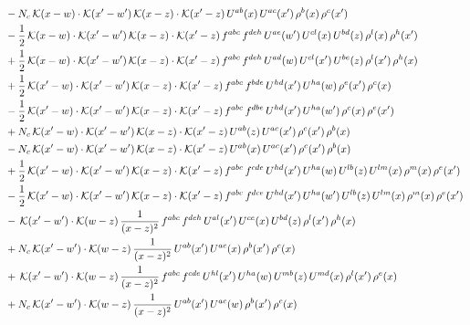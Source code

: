 \documentclass[9pt]{article}
\numberwithin{equation}{section}
\begin{document}
\begin{align}
&-N_{c}\,\mathcal{K}(x-w)\cdot\mathcal{K}(x'-w')\,\mathcal{K}(x-z)\cdot\mathcal{K}(x'-z)\,U^{ab}(x)\,U^{ac}(x')\,\rho^{b}(x)\,\rho^{c}(x')\notag \\ 
&-\frac{1}{2}\,\mathcal{K}(x-w)\cdot\mathcal{K}(x'-w')\,\mathcal{K}(x-z)\cdot\mathcal{K}(x'-z)\,f^{abc}\,f^{deh}\,U^{ae}(w')\,U^{cl}(x)\,U^{bd}(z)\,\rho^{l}(x)\,\rho^{h}(x')\notag \\ 
&+\frac{1}{2}\,\mathcal{K}(x-w)\cdot\mathcal{K}(x'-w')\,\mathcal{K}(x-z)\cdot\mathcal{K}(x'-z)\,f^{abc}\,f^{deh}\,U^{ad}(w)\,U^{cl}(x')\,U^{be}(z)\,\rho^{l}(x')\,\rho^{h}(x)\notag \\ 
&+\frac{1}{2}\,\mathcal{K}(x'-w)\cdot\mathcal{K}(x'-w')\,\mathcal{K}(x-z)\cdot\mathcal{K}(x'-z)\,f^{abc}\,f^{bde}\,U^{hd}(x')\,U^{ha}(w)\,\rho^{e}(x')\,\rho^{c}(x)\notag \\ 
&-\frac{1}{2}\,\mathcal{K}(x'-w)\cdot\mathcal{K}(x'-w')\,\mathcal{K}(x-z)\cdot\mathcal{K}(x'-z)\,f^{abc}\,f^{dbe}\,U^{hd}(x')\,U^{ha}(w')\,\rho^{c}(x)\,\rho^{e}(x')\notag \\ 
&+N_{c}\,\mathcal{K}(x'-w)\cdot\mathcal{K}(x'-w')\,\mathcal{K}(x-z)\cdot\mathcal{K}(x'-z)\,U^{ab}(z)\,U^{ac}(x')\,\rho^{c}(x')\,\rho^{b}(x)\notag \\ 
&-N_{c}\,\mathcal{K}(x'-w)\cdot\mathcal{K}(x'-w')\,\mathcal{K}(x-z)\cdot\mathcal{K}(x'-z)\,U^{ab}(x)\,U^{ac}(x')\,\rho^{c}(x')\,\rho^{b}(x)\notag \\ 
&+\frac{1}{2}\,\mathcal{K}(x'-w)\cdot\mathcal{K}(x'-w')\,\mathcal{K}(x-z)\cdot\mathcal{K}(x'-z)\,f^{abc}\,f^{cde}\,U^{hd}(x')\,U^{ha}(w)\,U^{lb}(z)\,U^{lm}(x)\,\rho^{m}(x)\,\rho^{e}(x')\notag \\ 
&-\frac{1}{2}\,\mathcal{K}(x'-w)\cdot\mathcal{K}(x'-w')\,\mathcal{K}(x-z)\cdot\mathcal{K}(x'-z)\,f^{abc}\,f^{dce}\,U^{hd}(x')\,U^{ha}(w')\,U^{lb}(z)\,U^{lm}(x)\,\rho^{m}(x)\,\rho^{e}(x')\notag \\ 
&-\,\mathcal{K}(x'-w')\cdot\mathcal{K}(w-z)\,\frac{1}{(x-z)^{2}}\,f^{abc}\,f^{deh}\,U^{al}(x')\,U^{ce}(x)\,U^{bd}(z)\,\rho^{l}(x')\,\rho^{h}(x)\notag \\ 
&+N_{c}\,\mathcal{K}(x'-w')\cdot\mathcal{K}(w-z)\,\frac{1}{(x-z)^{2}}\,U^{ab}(x')\,U^{ac}(x)\,\rho^{b}(x')\,\rho^{c}(x)\notag \\ 
&+\,\mathcal{K}(x'-w')\cdot\mathcal{K}(w-z)\,\frac{1}{(x-z)^{2}}\,f^{abc}\,f^{cde}\,U^{hl}(x')\,U^{ha}(w)\,U^{mb}(z)\,U^{md}(x)\,\rho^{l}(x')\,\rho^{e}(x)\notag \\ 
&+N_{c}\,\mathcal{K}(x'-w')\cdot\mathcal{K}(w-z)\,\frac{1}{(x-z)^{2}}\,U^{ab}(x')\,U^{ac}(w)\,\rho^{b}(x')\,\rho^{c}(x)\notag \\ 

\end{align}
\end{document}

